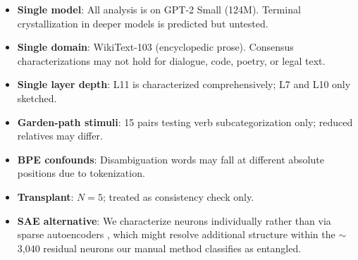 \documentclass{article}
\begin{document}
\begin{itemize}
\item \textbf{Single model}: All analysis is on GPT-2 Small (124M). Terminal
crystallization in deeper models is predicted but untested.
\item \textbf{Single domain}: WikiText-103 (encyclopedic prose). Consensus
characterizations may not hold for dialogue, code, poetry, or legal text.
\item \textbf{Single layer depth}: L11 is characterized comprehensively; L7 and
L10 only sketched.
\item \textbf{Garden-path stimuli}: 15 pairs testing verb subcategorization only;
reduced relatives may differ.
\item \textbf{BPE confounds}: Disambiguation words may fall at different absolute
positions due to tokenization.
\item \textbf{Transplant}: $N = 5$; treated as consistency check only.
\item \textbf{SAE alternative}: We characterize neurons individually rather than
via sparse autoencoders \citep{bricken2023monosemanticity, templeton2024scaling},
which might resolve additional structure within the $\sim$3{,}040 residual
neurons our manual method classifies as entangled.
\end{itemize}
\end{document}
